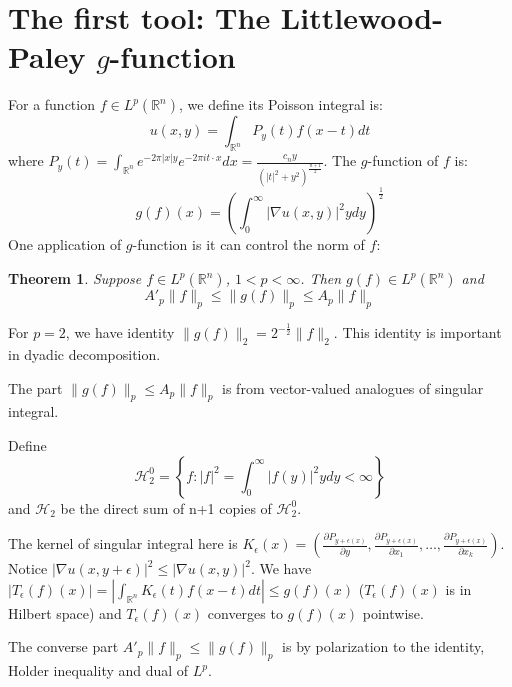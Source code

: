 \documentclass{report}
\theoremstyle{definition}
\theoremstyle{definition}
\theoremstyle{plain}
\newtheorem{theorem}{Theorem}
\numberwithin{theorem}{section}
\numberwithin{remark}{section}
\numberwithin{equation}{section}
\newcommand{\norm}[1]{\lVert#1\rVert}
\newcommand{\abs}[1]{\left\lvert#1\right\rvert}
\begin{document}
\section{The first tool: The Littlewood-Paley $g$-function}
For a function $f\in L^p(\mathbb{R}^n)$, we define its Poisson integral is:
\begin{equation*}
    u(x,y)=\int_{\mathbb{R}^n}P_y(t)f(x-t)d t
\end{equation*}
where $P_y(t)=\int_{\mathbb{R}^n}e^{-2\pi\abs{x}y}e^{-2\pi i t\cdot x }dx=\frac{c_ny}{(\abs{t}^2+y^2)^{\frac{n+1}{2}}}$. The $g$-function of $f$ is:
\begin{equation*}
    g(f)(x)=\left( \int_{0}^{\infty} \abs{\nabla u(x,y)}^2 y d y\right)^\frac{1}{2}
\end{equation*}
One application of $g$-function is it can control the norm of $f$:
\begin{theorem}\label{thm: g-function control f}
    Suppose $f\in L^p(\mathbb{R}^n)$, $1<p<\infty$. Then $g(f)\in L^p(\mathbb{R}^n)$ and
    \begin{equation*}
        A'_p\norm{f}_p\leq \norm{g(f)}_p\leq A_p\norm{f}_p
    \end{equation*}
\end{theorem}
For $p=2$, we have identity $\norm{g(f)}_2= 2^{-\frac{1}{2}}\norm{f}_2$. This identity is important in dyadic decomposition.\par
The part $\norm{g(f)}_p\leq A_p\norm{f}_p$ is from vector-valued analogues of singular integral. \par
Define
\begin{equation*}
    \mathscr{H}_2^0=\left\{ f: \abs{f}^2=\int_{0}^{\infty}\abs{f(y)}^2y dy<\infty \right\}
\end{equation*}
and $\mathscr{H}_2$ be the direct sum of n+1 copies of $\mathscr{H}_2^0$.\par
The kernel of singular integral here is $K_\epsilon(x)=(\frac{\partial P_{y+\epsilon(x)}}{\partial y},\frac{\partial P_{y+\epsilon(x)}}{\partial x_1},\dots,\frac{\partial P_{y+\epsilon(x)}}{\partial x_k})$. Notice $\abs{\nabla u(x,y+\epsilon)}^2\leq \abs{\nabla u(x,y)}^2$. We have $\abs{T_\epsilon(f)(x)}=\abs{\int_{\mathbb{R}^n}{K_\epsilon(t)f(x-t)dt}}\leq g(f)(x)$ ($T_\epsilon(f)(x)$ is in Hilbert space) and $T_\epsilon(f)(x)$ converges to $g(f)(x)$ pointwise.\par
The converse part $ A'_p\norm{f}_p\leq \norm{g(f)}_p$ is by polarization to the identity, Holder inequality and dual of $L^p$.
\end{document}
